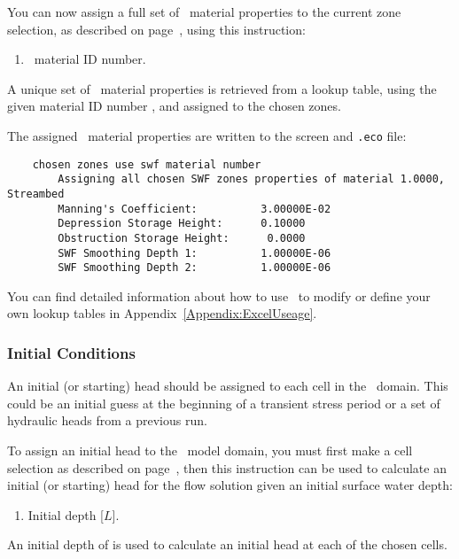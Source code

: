 You can now assign a full set of \swf\ material properties to the current zone selection, as described on page~\pageref{page:zoneSelect}, using this instruction:

    {
        \squish
        \begin{enumerate}
        \item {}  \swf\ material ID number.
        \end{enumerate}
          A unique set of \swf\ material properties is retrieved from a lookup table, using the given  material ID number , and assigned to the chosen zones.
    }

The assigned \swf\ material properties are written to the screen and \texttt{.eco} file:
\begin{verbatim}
    chosen zones use swf material number
    	Assigning all chosen SWF zones properties of material 1.0000, Streambed
    	Manning's Coefficient:          3.00000E-02
    	Depression Storage Height:      0.10000
    	Obstruction Storage Height:      0.0000
    	SWF Smoothing Depth 1:          1.00000E-06
    	SWF Smoothing Depth 2:          1.00000E-06
\end{verbatim}

You can find detailed information about how to use \excel\ to modify or define your own lookup tables in Appendix~\ref{Appendix:ExcelUseage}.

\subsubsection{Initial Conditions}  
An initial (or starting) head should be assigned to each cell in the \swf\ domain.  This could be an initial guess at the beginning of a transient stress period or a set of hydraulic heads from a previous run.

To assign an initial head to the \swf\ model domain, you must first make a cell selection as described on page~\pageref{page:cellSelect}, then this instruction can be used to calculate an initial (or starting) head for the flow solution given an initial surface water depth:

    {
        \squish
        \begin{enumerate}
        \item {}  Initial depth [$L$].
        \end{enumerate}
          An initial depth of  is used to calculate an initial head at each of the chosen cells.
    }


